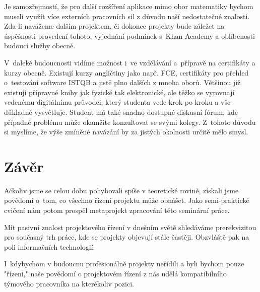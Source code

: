 \documentclass[12pt, a4paper]{report}
\begin{document}
Je samozřejmostí, že pro další rozšíření aplikace mimo obor matematiky bychom
museli využít více externích pracovních sil z důvodu naší nedostatečné znalosti.
Zda-li navážeme dalším projektem, či dokonce projekty bude záležet na úspěšnosti
provedení tohoto, vyjednání podmínek s Khan Academy a oblíbenosti budoucí služby
obecně.

V daleké budoucnosti vidíme možnost i ve vzdělávání a přípravě na certifikáty a
kurzy obecně. Existují kurzy angličtiny jako např. FCE, certifikáty pro přehled
o testování software ISTQB a jistě plno dalších z mnoha oborů. Většinou již
existují přípravné knihy jak fyzické tak elektronické, ale těžko se vyrovnají
vedenému digitálnímu průvodci, který studenta vede krok po kroku a vše důkladně
vysvětluje. Student má také snadno dostupné diskusní fórum, kde případné
problému může okamžite konzultovat se svými kolegy. Z tohoto důvodu si myslíme,
že výše zmíněné navázání by za jistých okolnosti určitě mělo smysl.

\chapter{Závěr}
\label{sec:org9de7726}
Ačkoliv jsme se celou dobu pohybovali spíše v teoretické rovině, získali jsme
povědomí o tom, co všechno řízení projektu může obnášet. Jako semi-praktické
cvičení nám potom prospěl metaprojekt zpracování této seminární práce.

Mít pasivní znalost projektového řízení v dnešním světě shledáváme prerekvizitou
pro současný trh práce, kde se projekty objevují stále častěji. Obzvláště pak na
poli informačních technologií.

I kdybychom v budoucnu profesionálně projekty neřídili a byli bychom pouze
"řízeni," naše povědomí o projektovém řízení z nás udělá kompatibilního týmového
pracovníka na kterékoliv pozici.



\printbibliography
\end{document}
